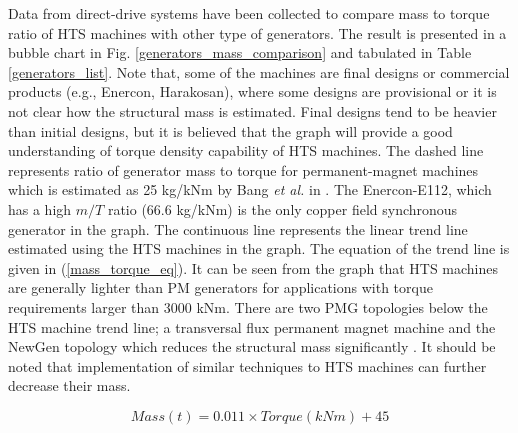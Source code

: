 \documentclass[12pt]{iopart}
\begin{document}
Data from direct-drive systems have been collected to compare mass to torque ratio of HTS machines with other type of generators. The result is presented in a bubble chart in Fig. \ref{generators_mass_comparison} and tabulated in Table \ref{generators_list}.  Note that, some of the machines are final designs or commercial products (e.g., Enercon, Harakosan), where some designs are provisional or it is not clear how the structural mass is estimated. Final designs tend to be heavier than initial designs, but it is believed that the graph will provide a good understanding of torque density capability of HTS machines.  The dashed line represents ratio of generator mass to torque for permanent-magnet machines which is estimated as 25 kg/kNm by Bang \textit{et al.} in \cite{Bang2008}. The Enercon-E112, which has a high $m/T$ ratio (66.6 kg/kNm) is the only copper field synchronous generator in the graph. The continuous line represents the linear trend line estimated using the HTS machines in the graph. The equation of the trend line is given in (\ref{mass_torque_eq}). It can be seen from the graph that HTS machines are generally lighter than PM generators for applications with torque requirements larger than 3000 kNm. There are two PMG topologies below the HTS machine trend line; a transversal flux permanent magnet machine \cite{Bang2009} and the NewGen topology which reduces the structural mass significantly \cite{Engstrom2004}. It should be noted that implementation of similar techniques to HTS machines can further decrease their mass. 

 \begin{equation}
     Mass(t)=0.011\times Torque(kNm)+45
     \label{mass_torque_eq}
 \end{equation}
\end{document}
